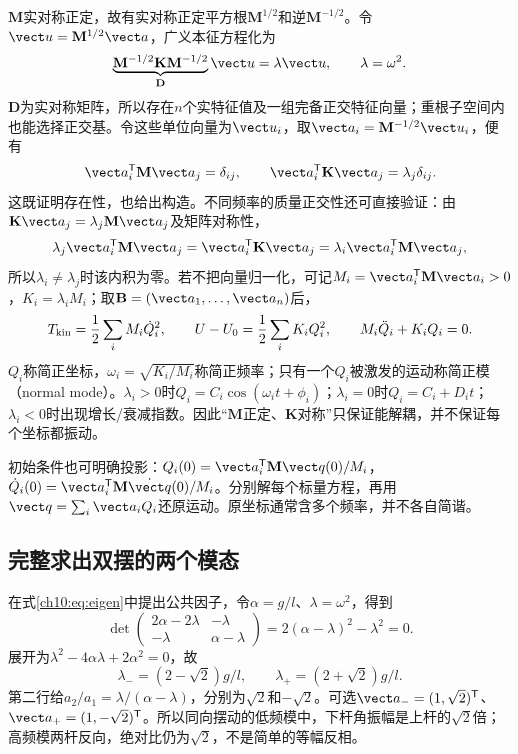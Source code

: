 $\mathbf M$实对称正定，故有实对称正定平方根$\mathbf M^{1/2}$和逆$\mathbf M^{-1/2}$。令$\vect u=\mathbf M^{1/2}\vect a$，广义本征方程化为
\[
 \underbrace{\mathbf M^{-1/2}\mathbf K\mathbf M^{-1/2}}_{\mathbf D}
 \vect u=\lambda\vect u,\qquad\lambda=\omega^2.
\]
$\mathbf D$为实对称矩阵，所以存在$n$个实特征值及一组完备正交特征向量；重根子空间内也能选择正交基。令这些单位向量为$\vect u_i$，取$\vect a_i=\mathbf M^{-1/2}\vect u_i$，便有
\[
 \vect a_i^{\mathsf T}\mathbf M\vect a_j=\delta_{ij},\qquad
 \vect a_i^{\mathsf T}\mathbf K\vect a_j=\lambda_j\delta_{ij}.
\]
这既证明存在性，也给出构造。不同频率的质量正交性还可直接验证：由$\mathbf K\vect a_j=\lambda_j\mathbf M\vect a_j$及矩阵对称性，
\[
 \lambda_j\vect a_i^{\mathsf T}\mathbf M\vect a_j
 =\vect a_i^{\mathsf T}\mathbf K\vect a_j
 =\lambda_i\vect a_i^{\mathsf T}\mathbf M\vect a_j,
\]
所以$\lambda_i\ne\lambda_j$时该内积为零。若不把向量归一化，可记$M_i=\vect a_i^{\mathsf T}\mathbf M\vect a_i>0$，$K_i=\lambda_iM_i$；取$\mathbf B=(\vect a_1,\ldots,\vect a_n)$后，
\[
 T_{\rm kin}=\frac12\sum_i M_i\dot Q_i^2,
 \qquad U-U_0=\frac12\sum_i K_iQ_i^2,
 \qquad M_i\ddot Q_i+K_iQ_i=0.
\]
$Q_i$称简正坐标，$\omega_i=\sqrt{K_i/M_i}$称简正频率；只有一个$Q_i$被激发的运动称简正模（normal mode）。$\lambda_i>0$时$Q_i=C_i\cos(\omega_it+\phi_i)$；$\lambda_i=0$时$Q_i=C_i+D_it$；$\lambda_i<0$时出现增长/衰减指数。因此“$\mathbf M$正定、$\mathbf K$对称”只保证能解耦，并不保证每个坐标都振动。

初始条件也可明确投影：$Q_i(0)=\vect a_i^{\mathsf T}\mathbf M\vect q(0)/M_i$，$\dot Q_i(0)=\vect a_i^{\mathsf T}\mathbf M\dot{\vect q}(0)/M_i$。分别解每个标量方程，再用$\vect q=\sum_i\vect a_iQ_i$还原运动。原坐标通常含多个频率，并不各自简谐。

\subsection{完整求出双摆的两个模态}
在式\eqref{ch10:eq:eigen}中提出公共因子，令$\alpha=g/l$、$\lambda=\omega^2$，得到
\[
 \det\begin{pmatrix}2\alpha-2\lambda&-\lambda\\-\lambda&\alpha-\lambda\end{pmatrix}
 =2(\alpha-\lambda)^2-\lambda^2=0.
\]
展开为$\lambda^2-4\alpha\lambda+2\alpha^2=0$，故
\[
 \lambda_-=(2-\sqrt2)g/l,\qquad
 \lambda_+=(2+\sqrt2)g/l.
\]
第二行给$a_2/a_1=\lambda/(\alpha-\lambda)$，分别为$\sqrt2$和$-\sqrt2$。可选$\vect a_-=(1,\sqrt2)^{\mathsf T}$、$\vect a_+=(1,-\sqrt2)^{\mathsf T}$。所以同向摆动的低频模中，下杆角振幅是上杆的$\sqrt2$倍；高频模两杆反向，绝对比仍为$\sqrt2$，不是简单的等幅反相。

